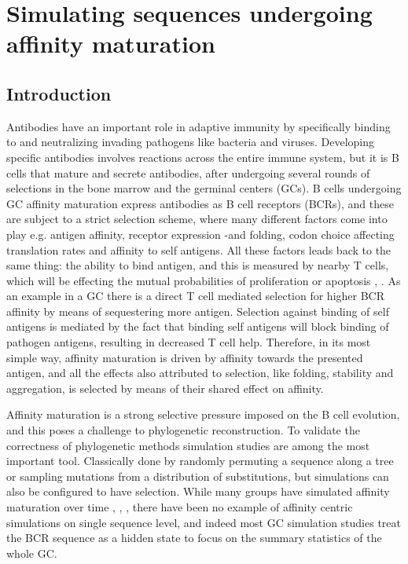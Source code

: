 \chapter{Simulating sequences undergoing affinity maturation}

\section{Introduction}
Antibodies have an important role in adaptive immunity by specifically binding to and neutralizing invading pathogens like bacteria and viruses.
Developing specific antibodies involves reactions across the entire immune system, but it is B cells that mature and secrete antibodies, after undergoing several rounds of selections in the bone marrow and the germinal centers (GCs).
B cells undergoing GC affinity maturation express antibodies as B cell receptors (BCRs), and these are subject to a strict selection scheme, where many different factors come into play e.g. antigen affinity, receptor expression -and folding, codon choice affecting translation rates and affinity to self antigens.
All these factors leads back to the same thing: the ability to bind antigen, and this is measured by nearby T cells, which will be effecting the mutual probabilities of proliferation or apoptosis \cite{Bannard_Cyster_2017}, \cite{victora2012germinal}.
As an example in a GC there is a direct T cell mediated selection for higher BCR affinity by means of sequestering more antigen.
Selection against binding of self antigens is mediated by the fact that binding self antigens will block binding of pathogen antigens, resulting in decreased T cell help.
Therefore, in its most simple way, affinity maturation is driven by affinity towards the presented antigen, and all the effects also attributed to selection, like folding, stability and aggregation, is selected by means of their shared effect on affinity.

Affinity maturation is a strong selective pressure imposed on the B cell evolution, and this poses a challenge to phylogenetic reconstruction.%
To validate the correctness of phylogenetic methods simulation studies are among the most important tool.
Classically done by randomly permuting a sequence along a tree or sampling mutations from a distribution of substitutions, but simulations can also be configured to have selection.
While many groups have simulated affinity maturation over time \cite{Reshetova_2017}, \cite{Balelli_2016}, \cite{Childs_Baskerville_Cobey_2015}, there have been no example of affinity centric simulations on single sequence level, and indeed most GC simulation studies treat the BCR sequence as a hidden state to focus on the summary statistics of the whole GC.


